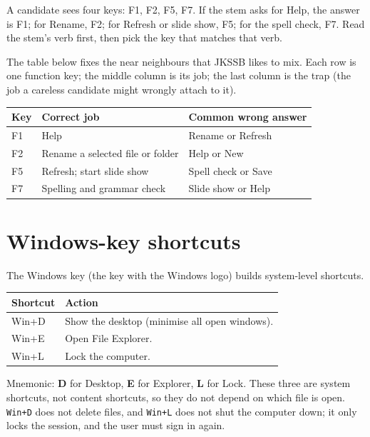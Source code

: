 \begin{example}
A candidate sees four keys: F1, F2, F5, F7. If the stem asks for Help, the
answer is F1; for Rename, F2; for Refresh or slide show, F5; for the spell
check, F7. Read the stem's verb first, then pick the key that matches that verb.
\end{example}

The table below fixes the near neighbours that JKSSB likes to mix. Each row is
one function key; the middle column is its job; the last column is the trap
(the job a careless candidate might wrongly attach to it).

\begin{center}
\begin{tabular}{p{}p{}p{}}
\toprule
\textbf{Key} & \textbf{Correct job} & \textbf{Common wrong answer} \\
\midrule
F1 & Help & Rename or Refresh \\
F2 & Rename a selected file or folder & Help or New \\
F5 & Refresh; start slide show & Spell check or Save \\
F7 & Spelling and grammar check & Slide show or Help \\
\bottomrule
\end{tabular}
\end{center}

\section{Windows-key shortcuts}
The Windows key (the key with the Windows logo) builds system-level shortcuts.

\begin{center}
\begin{tabular}{p{}p{}}
\toprule
\textbf{Shortcut} & \textbf{Action} \\
\midrule
Win+D & Show the desktop (minimise all open windows). \\
Win+E & Open File Explorer. \\
Win+L & Lock the computer. \\
\bottomrule
\end{tabular}
\end{center}

Mnemonic: \textbf{D} for Desktop, \textbf{E} for Explorer, \textbf{L} for
Lock. These three are system shortcuts, not content shortcuts, so they do not
depend on which file is open. \texttt{Win+D} does not delete files, and
\texttt{Win+L} does not shut the computer down; it only locks the session, and
the user must sign in again.

